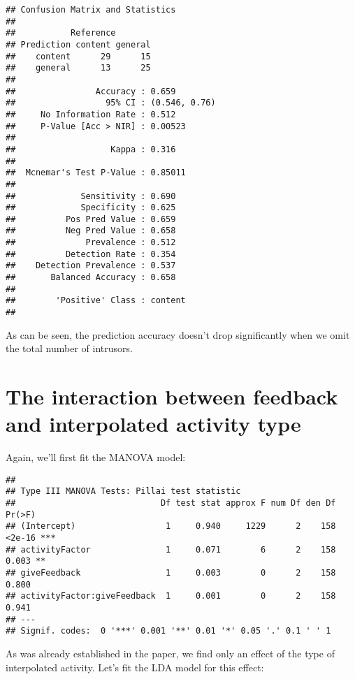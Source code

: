 \documentclass[11pt,]{article}
\begin{document}
\begin{verbatim}
## Confusion Matrix and Statistics
## 
##           Reference
## Prediction content general
##    content      29      15
##    general      13      25
##                                        
##                Accuracy : 0.659        
##                  95% CI : (0.546, 0.76)
##     No Information Rate : 0.512        
##     P-Value [Acc > NIR] : 0.00523      
##                                        
##                   Kappa : 0.316        
##                                        
##  Mcnemar's Test P-Value : 0.85011      
##                                        
##             Sensitivity : 0.690        
##             Specificity : 0.625        
##          Pos Pred Value : 0.659        
##          Neg Pred Value : 0.658        
##              Prevalence : 0.512        
##          Detection Rate : 0.354        
##    Detection Prevalence : 0.537        
##       Balanced Accuracy : 0.658        
##                                        
##        'Positive' Class : content      
## 
\end{verbatim}

As can be seen, the prediction accuracy doesn't drop significantly when
we omit the total number of intrusors.

\hypertarget{the-interaction-between-feedback-and-interpolated-activity-type}{%
\section{The interaction between feedback and interpolated activity
type}\label{the-interaction-between-feedback-and-interpolated-activity-type}}

Again, we'll first fit the MANOVA model:

\begin{verbatim}
## 
## Type III MANOVA Tests: Pillai test statistic
##                             Df test stat approx F num Df den Df Pr(>F)    
## (Intercept)                  1     0.940     1229      2    158 <2e-16 ***
## activityFactor               1     0.071        6      2    158  0.003 ** 
## giveFeedback                 1     0.003        0      2    158  0.800    
## activityFactor:giveFeedback  1     0.001        0      2    158  0.941    
## ---
## Signif. codes:  0 '***' 0.001 '**' 0.01 '*' 0.05 '.' 0.1 ' ' 1
\end{verbatim}

As was already established in the paper, we find only an effect of the
type of interpolated activity. Let's fit the LDA model for this effect:
\end{document}
